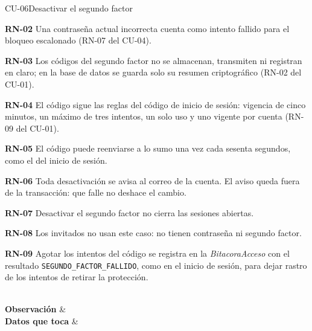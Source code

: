\begin{fichacu}{CU-06}{Desactivar el segundo factor}
{\begin{cureglas}
      \item \textbf{\mbox{RN-02}} Una contraseña actual incorrecta cuenta como intento fallido para el bloqueo escalonado (\mbox{RN-07} del \mbox{CU-04}).
      \item \textbf{\mbox{RN-03}} Los códigos del segundo factor no se almacenan, transmiten ni registran en claro; en la base de datos se guarda solo su resumen criptográfico (\mbox{RN-02} del \mbox{CU-01}).
      \item \textbf{\mbox{RN-04}} El código sigue las reglas del código de inicio de sesión: vigencia de cinco minutos, un máximo de tres intentos, un solo uso y uno vigente por cuenta (\mbox{RN-09} del \mbox{CU-01}).
      \item \textbf{\mbox{RN-05}} El código puede reenviarse a lo sumo una vez cada sesenta segundos, como el del inicio de sesión.
      \item \textbf{\mbox{RN-06}} Toda desactivación se avisa al correo de la cuenta. El aviso queda fuera de la transacción: que falle no deshace el cambio.
      \item \textbf{\mbox{RN-07}} Desactivar el segundo factor no cierra las sesiones abiertas.
      \item \textbf{\mbox{RN-08}} Los invitados no usan este caso: no tienen contraseña ni segundo factor.
      \item \textbf{\mbox{RN-09}} Agotar los intentos del código se registra en la \textit{BitacoraAcceso} con el resultado \texttt{SEGUNDO\_\allowbreak{}FACTOR\_\allowbreak{}FALLIDO}, como en el inicio de sesión, para dejar rastro de los intentos de retirar la protección.
    \end{cureglas}} \\ \hline
  \textbf{Observación} &  \\ \hline
  \textbf{Datos que toca} & 
\end{fichacu}
